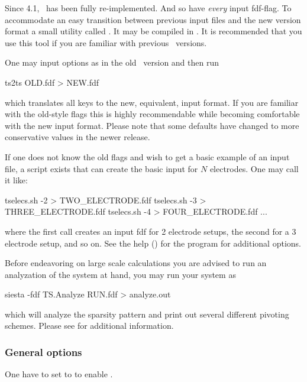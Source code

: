 Since 4.1, \tsiesta\ has been fully re-implemented. And so have
\emph{every} input fdf-flag. To accommodate an easy transition between
previous input files and the new version format a small utility called
. It may be compiled in . It is
recommended that you use this tool if you are familiar with previous
\tsiesta\ versions.

%
One may input options as in the old \tsiesta\ version and then run
\begin{fdfexample}
  ts2ts OLD.fdf > NEW.fdf
\end{fdfexample}
which translates all keys to the new, equivalent, input format. If you
are familiar with the old-style flags this is highly recommendable
while becoming comfortable with the new input format. Please note that
some defaults have changed to more conservative values in the newer
release.

If one does not know the old flags and wish to get a basic example of
an input file, a script  exists that can
create the basic input for $N$ electrodes. One may call it like:
\begin{shellexample}
  tselecs.sh -2 > TWO_ELECTRODE.fdf
  tselecs.sh -3 > THREE_ELECTRODE.fdf
  tselecs.sh -4 > FOUR_ELECTRODE.fdf
  ...
\end{shellexample}
where the first call creates an input fdf for 2 electrode setups, the
second for a 3 electrode setup, and so on. See the help ()
for the program for additional options.

Before endeavoring on large scale calculations you are advised to run
an analyzation of the system at hand, you may run your system as
\begin{shellexample}
  siesta -fdf TS.Analyze RUN.fdf > analyze.out
\end{shellexample}
which will analyze the sparsity pattern and print out several
different pivoting schemes. Please see  for additional
information.


\subsubsection{General options}

One have to set  to  to enable
\tsiesta.

